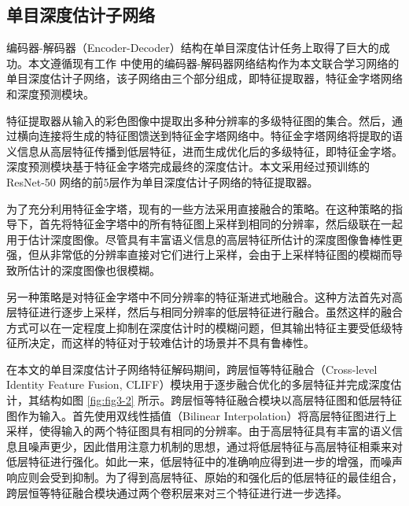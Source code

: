 \subsection{单目深度估计子网络}

编码器-解码器（Encoder-Decoder）结构在单目深度估计任务上取得了巨大的成功。本文遵循现有工作 \cite{DBLP:conf/eccv/WangZWLR20} 中使用的编码器-解码器网络结构作为本文联合学习网络的单目深度估计子网络，该子网络由三个部分组成，即特征提取器，特征金字塔网络和深度预测模块。

特征提取器从输入的彩色图像中提取出多种分辨率的多级特征图的集合。然后，通过横向连接将生成的特征图馈送到特征金字塔网络中。特征金字塔网络将提取的语义信息从高层特征传播到低层特征，进而生成优化后的多级特征，即特征金字塔。深度预测模块基于特征金字塔完成最终的深度估计。本文采用经过预训练的 ResNet-50 网络的前5层作为单目深度估计子网络的特征提取器。

为了充分利用特征金字塔，现有的一些方法采用直接融合的策略。在这种策略的指导下，首先将特征金字塔中的所有特征图上采样到相同的分辨率，然后级联在一起用于估计深度图像。尽管具有丰富语义信息的高层特征所估计的深度图像鲁棒性更强，但从非常低的分辨率直接对它们进行上采样，会由于上采样特征图的模糊而导致所估计的深度图像也很模糊。

另一种策略是对特征金字塔中不同分辨率的特征渐进式地融合。这种方法首先对高层特征进行逐步上采样，然后与相同分辨率的低层特征进行融合。虽然这样的融合方式可以在一定程度上抑制在深度估计时的模糊问题，但其输出特征主要受低级特征所决定，而这样的特征对于较难估计的场景并不具有鲁棒性。

在本文的单目深度估计子网络特征解码期间，跨层恒等特征融合（Cross-level Identity Feature Fusion, CLIFF）模块用于逐步融合优化的多层特征并完成深度估计，其结构如图 \ref{fig:fig3-2} 所示。跨层恒等特征融合模块以高层特征图和低层特征图作为输入。首先使用双线性插值（Bilinear Interpolation）将高层特征图进行上采样，使得输入的两个特征图具有相同的分辨率。由于高层特征具有丰富的语义信息且噪声更少，因此借用注意力机制的思想，通过将低层特征与高层特征相乘来对低层特征进行强化。如此一来，低层特征中的准确响应得到进一步的增强，而噪声响应则会受到抑制。为了得到高层特征、原始的和强化后的低层特征的最佳组合，跨层恒等特征融合模块通过两个卷积层来对三个特征进行进一步选择。

